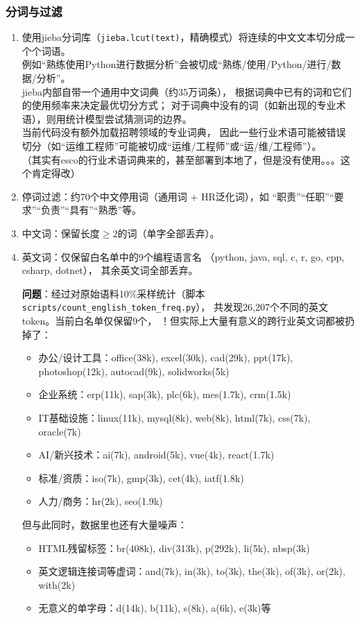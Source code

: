 \documentclass[12pt,a4paper]{ctexart}
\begin{document}
\subsubsection{分词与过滤}
\begin{enumerate}
\item 使用jieba分词库（\texttt{jieba.lcut(text)}，精确模式）将连续的中文文本切分成一个个词语。\\
例如``熟练使用Python进行数据分析''会被切成``熟练/使用/Python/进行/数据/分析''。
\\jieba内部自带一个通用中文词典（约35万词条），
根据词典中已有的词和它们的使用频率来决定最优切分方式；
对于词典中没有的词（如新出现的专业术语），则用统计模型尝试猜测词的边界。
\\当前代码没有额外加载招聘领域的专业词典，
因此一些行业术语可能被错误切分（如``运维工程师''可能被切成``运维/工程师''或``运/维/工程师''）。
\\（其实有esco的行业术语词典来的，甚至部署到本地了，但是没有使用。。。这个肯定得改）
\item 停词过滤：约70个中文停用词（通用词 + HR泛化词），如
``职责''``任职''``要求''``负责''``具有''``熟悉''等。
\item 中文词：保留长度$\geq 2$的词（单字全部丢弃）。
\item 英文词：仅保留白名单中的9个编程语言名
（python, java, sql, c, r, go, cpp, csharp, dotnet），
其余英文词全部丢弃。

\textbf{问题}：经过对原始语料10\%采样统计（脚本 \texttt{scripts/count\_english\_token\_freq.py}），
共发现26,207个不同的英文token。当前白名单仅保留9个，
！但实际上大量有意义的跨行业英文词都被扔掉了：
\begin{itemize}
\item 办公/设计工具：office(38k), excel(30k), cad(29k), ppt(17k), photoshop(12k), autocad(9k), solidworks(5k)
\item 企业系统：erp(11k), sap(3k), plc(6k), mes(1.7k), crm(1.5k)
\item IT基础设施：linux(11k), mysql(8k), web(8k), html(7k), css(7k), oracle(7k)
\item AI/新兴技术：ai(7k), android(5k), vue(4k), react(1.7k)
\item 标准/资质：iso(7k), gmp(3k), cet(4k), iatf(1.8k)
\item 人力/商务：hr(2k), seo(1.9k)
\end{itemize}
但与此同时，数据里也还有大量噪声：
\begin{itemize}
\item HTML残留标签：br(408k), div(313k), p(292k), li(5k), nbsp(3k)
\item 英文逻辑连接词等虚词：and(7k), in(3k), to(3k), the(3k), of(3k), or(2k), with(2k)
\item 无意义的单字母：d(14k), b(11k), s(8k), a(6k), e(3k)等
\end{itemize}


\end{enumerate}
\end{document}
